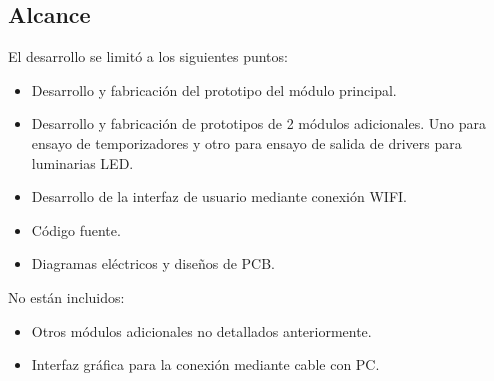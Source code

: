\subsection{Alcance}
El desarrollo se limitó a los siguientes puntos:
\begin{itemize}
	\item Desarrollo y fabricación del prototipo del módulo principal.
	\item Desarrollo y fabricación de prototipos de 2 módulos adicionales. Uno para ensayo de 			temporizadores y otro para ensayo de salida de drivers para luminarias LED.
	\item Desarrollo de la interfaz de usuario mediante conexión WIFI.	
	\item Código fuente.
	\item Diagramas eléctricos y diseños de PCB.
\end{itemize}

No están incluidos:

\begin{itemize}
	\item Otros módulos adicionales no detallados anteriormente.
	\item Interfaz gráfica para la conexión mediante cable con PC.
\end{itemize}






